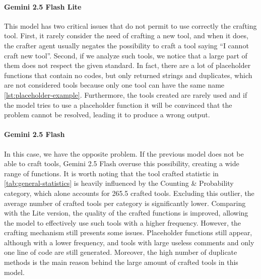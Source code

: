 \documentclass[12pt,a4paper,openright,twoside]{book}
\begin{document}
\paragraph{Gemini 2.5 Flash Lite} This model has two critical issues that do not permit to use correctly the crafting tool. 
First, it rarely consider the need of crafting a new tool, and when it does, the crafter agent usually negates the possibility to craft a tool saying ``I cannot craft new tool''.
Second, if we analyze such tools, we notice that a large part of them does not respect the given standard. 
In fact, there are a lot of placeholder functions that contain no codes, but only returned strings and duplicates, which are not considered tools because only one tool can have the same name \ref{lst:placeholder-example}.
Furthermore, the tools created are rarely used and if the model tries to use a placeholder function it will be convinced that the problem cannot be resolved, leading it to produce a wrong output.

\paragraph{Gemini 2.5 Flash} In this case, we have the opposite problem. If the previous model does not be able to craft tools, Gemini 2.5 Flash overuse this possibility, creating a wide range of functions. 
It is worth noting that the tool crafted statistic in \cref{tab:general-statistics} is heavily influenced by the Counting \& Probability category, which alone accounts for 265.5 crafted tools. 
Excluding this outlier, the average number of crafted tools per category is significantly lower.
Comparing with the Lite version, the quality of the crafted functions is improved, allowing the model to effectively use such tools with a higher frequency.
However, the crafting mechanism still presents some issues. 
Placeholder functions still appear, although with a lower frequency, and tools with large useless comments and only one line of code are still generated. 
Moreover, the high number of duplicate methods is the main reason behind the large amount of crafted tools in this model.
\end{document}
